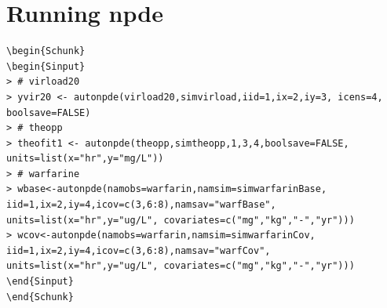 \documentclass{report}
\begin{document}
\newpage

\tableofcontents

\newpage



\setcounter{page}{1}

\section{Running npde }


\begin{lstlisting}[linerange=\\begin\{Sinput\}-\\end\{Sinput\}, includerangemarker=false]
\begin{Schunk}
\begin{Sinput}
> # virload20
> yvir20 <- autonpde(virload20,simvirload,iid=1,ix=2,iy=3, icens=4, boolsave=FALSE)
> # theopp
> theofit1 <- autonpde(theopp,simtheopp,1,3,4,boolsave=FALSE, units=list(x="hr",y="mg/L"))
> # warfarine
> wbase<-autonpde(namobs=warfarin,namsim=simwarfarinBase, iid=1,ix=2,iy=4,icov=c(3,6:8),namsav="warfBase", units=list(x="hr",y="ug/L", covariates=c("mg","kg","-","yr")))
> wcov<-autonpde(namobs=warfarin,namsim=simwarfarinCov, iid=1,ix=2,iy=4,icov=c(3,6:8),namsav="warfCov", units=list(x="hr",y="ug/L", covariates=c("mg","kg","-","yr")))
\end{Sinput}
\end{Schunk}
\end{lstlisting}
\end{document}
